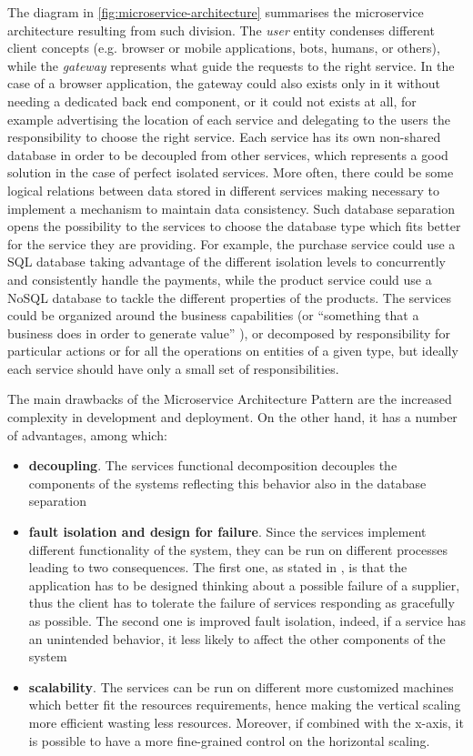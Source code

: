 The diagram in \autoref{fig:microservice-architecture} summarises the
microservice architecture resulting from such division. The \emph{user} entity
condenses different client concepts (e.g. browser or mobile applications, bots,
humans, or others), while the \emph{gateway} represents what guide the requests
to the right service. In the case of a browser application, the gateway could
also exists only in it without needing a dedicated back end component, or it
could not exists at all, for example advertising the location of each service
and delegating to the users the responsibility to choose the right service. Each
service has its own non-shared database in order to be decoupled from other
services, which represents a good solution in the case of perfect isolated
services. More often, there could be some logical relations between data stored
in different services making necessary to implement a mechanism to maintain data
consistency. Such database separation opens the possibility to the services to
choose the database type which fits better for the service they are providing.
For example, the purchase service could use a SQL database taking advantage of
the different isolation levels to concurrently and consistently handle the
payments, while the product service could use a NoSQL database to tackle the
different properties of the products. The services could be organized around the
business capabilities (or ``something that a business does in order to generate
value'' \cite{bib:decompose-business-capability}), or decomposed by
responsibility for particular actions or for all the operations on entities of a
given type, but ideally each service should have only a small set of
responsibilities.

The main drawbacks of the Microservice Architecture Pattern
\cite{bib:microservice-architecture} are the increased complexity in development
and deployment. On the other hand, it has a number of advantages, among which:

\begin{itemize}
	\item \textbf{decoupling}. The services functional decomposition decouples the
	components of the systems reflecting this behavior also in the database
	separation
	\item \textbf{fault isolation and design for failure}. Since the services
	implement different functionality of the system, they can be run on different
	processes leading to two consequences. The first one, as stated in
	\cite{bib:microservices-martin-fowler}, is that the application has to be
	designed thinking about a possible failure of a supplier, thus the client has
	to tolerate the failure of services responding as gracefully as possible. The
	second one is improved fault isolation, indeed, if a service has an unintended
	behavior, it less likely to affect the other components of the system
	\item \textbf{scalability}. The services can be run on different more
	customized machines which better fit the resources requirements, hence making
	the vertical scaling more efficient wasting less resources. Moreover, if
	combined with the x-axis, it is possible to have a more fine-grained control
	on the horizontal scaling.
\end{itemize}